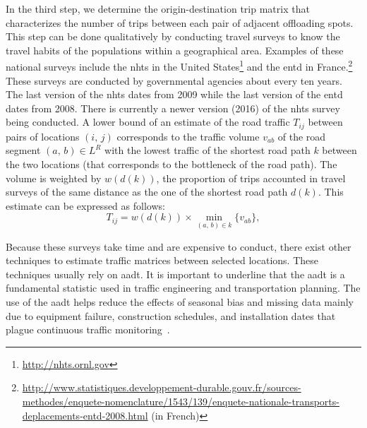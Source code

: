 In the third step, we determine the origin-destination trip matrix that characterizes the number of trips between each pair of adjacent offloading spots. This step can be done qualitatively by conducting travel surveys to know the travel habits of the populations within a geographical area. Examples of these national surveys include the \acrfull{nhts} in the United States\footnote{\url{http://nhts.ornl.gov}} and the \acrfull{entd} in France.\footnote{\url{http://www.statistiques.developpement-durable.gouv.fr/sources-methodes/enquete-nomenclature/1543/139/enquete-nationale-transports-deplacements-entd-2008.html} (in French)} These surveys are conducted by governmental agencies about every ten years. The last version of the \acrshort{nhts} dates from 2009 while the last version of the \acrshort{entd} dates from 2008. There is currently a newer version (2016) of the \acrshort{nhts} survey being conducted. A lower bound of an estimate of the road traffic $T_{ij}$ between pairs of locations $(i,\,j)$ corresponds to the traffic volume $v_{ab}$ of the road segment $(a,\,b)\in L^{R}$ with the lowest traffic of the shortest road path $k$ between the two locations (\ie that corresponds to the bottleneck of the road path). The volume is weighted by $w(d(k))$, the proportion of trips accounted in travel surveys of the same distance as the one of the shortest road path $d(k)$. This estimate can be expressed as follows:
\begin{equation}
    T_{ij} = w(d(k))\times\min_{(a,\,b)\in k}\{v_{ab}\},
\end{equation}

Because these surveys take time and are expensive to conduct, there exist other techniques to estimate traffic matrices between selected locations. These techniques usually rely on \acrfull{aadt}. It is important to underline that the \acrshort{aadt} is a fundamental statistic used in traffic engineering and transportation planning. The use of the \acrshort{aadt} helps reduce the effects of seasonal bias and missing data mainly due to equipment failure, construction schedules, and installation dates that plague continuous traffic monitoring~\cite{wright1997variability}.

